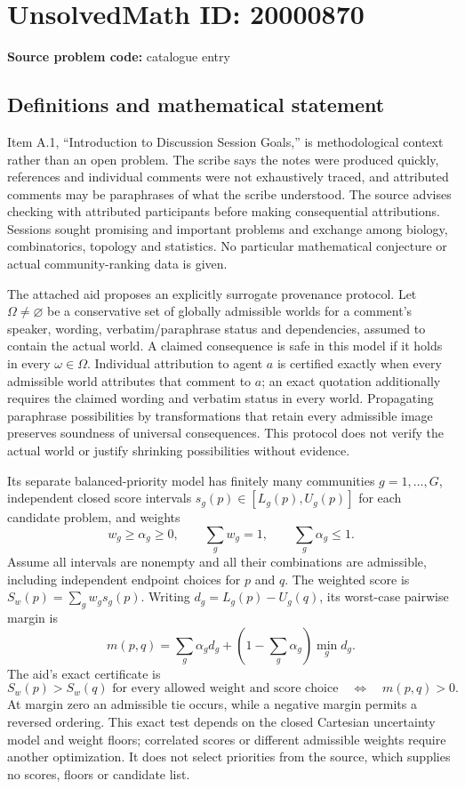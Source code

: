 \documentclass[11pt]{article}
\begin{document}
\section*{UnsolvedMath ID: 20000870}
\textbf{Source problem code:} catalogue entry
\subsection{Definitions and mathematical statement}
Item A.1, ``Introduction to Discussion Session Goals,'' is methodological context rather than an open problem. The scribe says the notes were produced quickly, references and individual comments were not exhaustively traced, and attributed comments may be paraphrases of what the scribe understood. The source advises checking with attributed participants before making consequential attributions. Sessions sought promising and important problems and exchange among biology, combinatorics, topology and statistics. No particular mathematical conjecture or actual community-ranking data is given.

The attached aid proposes an explicitly surrogate provenance protocol. Let $\Omega\ne\varnothing$ be a conservative set of globally admissible worlds for a comment's speaker, wording, verbatim/paraphrase status and dependencies, assumed to contain the actual world. A claimed consequence is safe in this model if it holds in every $\omega\in\Omega$. Individual attribution to agent $a$ is certified exactly when every admissible world attributes that comment to $a$; an exact quotation additionally requires the claimed wording and verbatim status in every world. Propagating paraphrase possibilities by transformations that retain every admissible image preserves soundness of universal consequences. This protocol does not verify the actual world or justify shrinking possibilities without evidence.

Its separate balanced-priority model has finitely many communities $g=1,\ldots,G$, independent closed score intervals $s_g(p)\in[L_g(p),U_g(p)]$ for each candidate problem, and weights
\[
w_g\ge\alpha_g\ge0,\qquad\sum_gw_g=1,\qquad\sum_g\alpha_g\le1.
\]
Assume all intervals are nonempty and all their combinations are admissible, including independent endpoint choices for $p$ and $q$. The weighted score is $S_w(p)=\sum_gw_gs_g(p)$. Writing $d_g=L_g(p)-U_g(q)$, its worst-case pairwise margin is
\[
m(p,q)=\sum_g\alpha_gd_g+\left(1-\sum_g\alpha_g\right)\min_g d_g.
\]
The aid's exact certificate is
\[
S_w(p)>S_w(q)\text{ for every allowed weight and score choice}
\quad\Longleftrightarrow\quad m(p,q)>0.
\]
At margin zero an admissible tie occurs, while a negative margin permits a reversed ordering. This exact test depends on the closed Cartesian uncertainty model and weight floors; correlated scores or different admissible weights require another optimization. It does not select priorities from the source, which supplies no scores, floors or candidate list.
\end{document}

